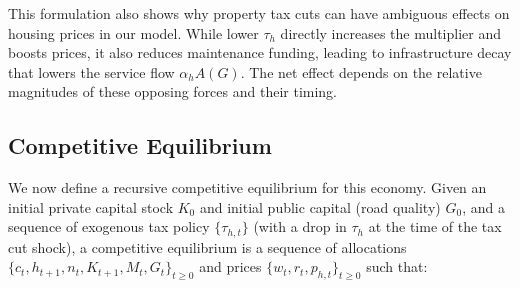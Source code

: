 This formulation also shows why property tax cuts can have ambiguous effects on housing prices in our model. While lower $\tau_h$ directly increases the multiplier and boosts prices, it also reduces maintenance funding, leading to infrastructure decay that lowers the service flow $\alpha_h A(G)$. The net effect depends on the relative magnitudes of these opposing forces and their timing.

\subsection{Competitive Equilibrium}

We now define a recursive competitive equilibrium for this economy. Given an initial private capital stock $K_0$ and initial public capital (road quality) $G_0$, and a sequence of exogenous tax policy $\{\tau_{h,t}\}$ (with a drop in $\tau_h$ at the time of the tax cut shock), a competitive equilibrium is a sequence of allocations $\{c_t, h_{t+1}, n_t, K_{t+1}, M_t, G_t\}_{t\ge0}$ and prices $\{w_t, r_t, p_{h,t}\}_{t\ge0}$ such that:

